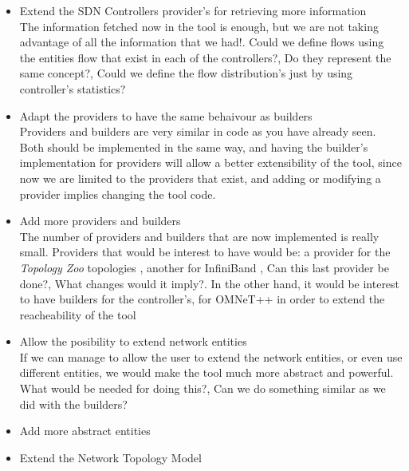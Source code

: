 \begin{itemize}
\item Extend the SDN Controllers provider's for retrieving more information\\
The information fetched now in the tool is enough, but we are not taking advantage of all the information that we had!. Could we define flows using the entities flow that exist in each of the controllers?, Do they represent the same concept?, Could we define the flow distribution's just by using controller's statistics?
\item Adapt the providers to have the same behaivour as builders\\
Providers and builders are very similar in code as you have already seen. Both should be implemented in the same way, and having the builder's implementation for providers will allow a better extensibility of the tool, since now we are limited to the providers that exist, and adding or modifying a provider implies changing the tool code. 
\item Add more providers and builders \\
The number of providers and builders that are now implemented is really small. Providers that would be interest to have would be: a provider for the \textit{Topology Zoo} topologies \cite{topologyzoo}, another for InfiniBand \cite{infiniband}, Can this last provider be done?, What changes would it imply?. In the other hand, it would be interest to have builders for the controller's, for OMNeT++ \cite{omnet} in order to extend the reacheability of the tool
\item Allow the posibility to extend network entities\\
If we can manage to allow the user to extend the network entities, or even use different entities, we would make the tool much more abstract and powerful. What would be needed for doing this?, Can we do something similar as we did with the builders?
\item Add more abstract entities\\
\item Extend the Network Topology Model 
\end{itemize}